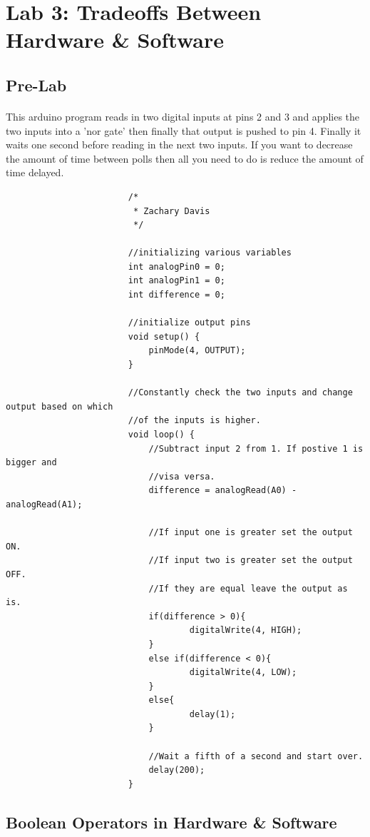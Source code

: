 \documentclass[12pt]{article}
\begin{document}
	\section{Lab 3: Tradeoffs Between Hardware \& Software}
		\subsection{Pre-Lab}
			\paragraph{}
				This arduino program reads in two digital inputs at pins 2 and 3 and applies the two inputs into a 'nor gate' then finally that output
				is pushed to pin 4.  Finally it waits one second before reading in the next two inputs.  If you want to decrease the amount of time
				between polls then all you need to do is reduce the amount of time delayed.

				\begin{center}
					\begin{verbatim}
						/*
 						 * Zachary Davis
 						 */

						//initializing various variables
						int analogPin0 = 0;
						int analogPin1 = 0;
						int difference = 0;

						//initialize output pins
						void setup() {
   							pinMode(4, OUTPUT);
						}

						//Constantly check the two inputs and change output based on which
						//of the inputs is higher.
						void loop() {
			  				//Subtract input 2 from 1. If postive 1 is bigger and 
  							//visa versa.
  							difference = analogRead(A0) - analogRead(A1);

  							//If input one is greater set the output ON.
  							//If input two is greater set the output OFF.
  							//If they are equal leave the output as is.
  							if(difference > 0){
    								digitalWrite(4, HIGH);
  							}
  							else if(difference < 0){
    								digitalWrite(4, LOW);
  							}
  							else{
    								delay(1);
  							}

  							//Wait a fifth of a second and start over.
  							delay(200);
						}
					\end{verbatim}
				\end{center}

		\subsection{Boolean Operators in Hardware \& Software}
\end{document}
